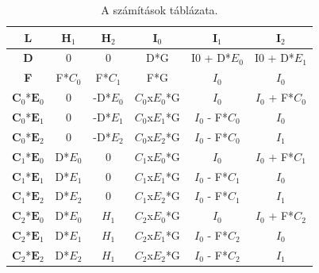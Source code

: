 \newpage
\begin{table}[h]
	\centering
	\caption{A számítások táblázata.}
	\begin{tabular}{|c||c|c|c|c|c|}
		\hline
		\textbf{L}     & $\textbf{H}_1$   & $\textbf{H}_2$    & $\textbf{I}_0$      & $\textbf{I}_1$        & $\textbf{I}_2$        \\ \hline
		\textbf{D}     & 0    & 0     & D*G     & I0 + D*$E_0$ & I0 + D*$E_1$ \\ \hline
		\textbf{F}     & F*$C_0$ & F*$C_1$  & F*G     & $I_0$        & $I_0$        \\ \hline
		$\textbf{C}_0$*$\textbf{E}_0$ & 0    & -D*$E_0$ & $C_0$x$E_0$*G & $I_0$        & $I_0$ + F*$C_0$ \\ \hline
		$\textbf{C}_0$*$\textbf{E}_1$ & 0    & -D*$E_1$ & $C_0$x$E_1$*G & $I_0$ - F*$C_0$ & $I_0$        \\ \hline
		$\textbf{C}_0$*$\textbf{E}_2$ & 0    & -D*$E_2$ & $C_0$x$E_2$*G & $I_0$ - F*$C_0$ & $I_1$        \\ \hline
		$\textbf{C}_1$*$\textbf{E}_0$ & D*$E_0$ & 0     & $C_1$x$E_0$*G & $I_0$        & $I_0$ + F*$C_1$ \\ \hline
		$\textbf{C}_1$*$\textbf{E}_1$ & D*$E_1$ & 0     & $C_1$x$E_1$*G & $I_0$ - F*$C_1$ & $I_0$        \\ \hline
		$\textbf{C}_1$*$\textbf{E}_2$ & D*$E_2$ & 0     & $C_1$x$E_2$*G & $I_0$ - F*$C_1$ & $I_1$        \\ \hline
		$\textbf{C}_2$*$\textbf{E}_0$ & D*$E_0$ & $H_1$    & $C_2$x$E_0$*G & $I_0$        & $I_0$ + F*$C_2$ \\ \hline
		$\textbf{C}_2$*$\textbf{E}_1$ & D*$E_1$ & $H_1$    & $C_2$x$E_1$*G & $I_0$ - F*$C_2$ & $I_0$        \\ \hline
		$\textbf{C}_2$*$\textbf{E}_2$ & D*$E_2$ & $H_1$   & $C_2$x$E_2$*G & $I_0$ - F*$C_2$ & $I_1$        \\ \hline
	\end{tabular}
\end{table}
\newpage




